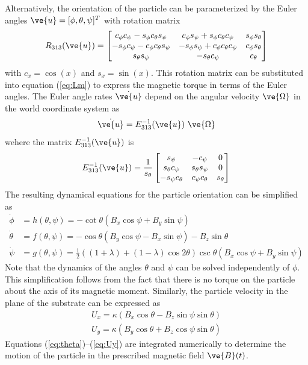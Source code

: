 Alternatively, the orientation of the particle can be parameterized by the Euler angles $\ve{u}=[\phi,\theta,\psi]^T$ with rotation matrix\autocite{Diebel2006}
\begin{equation}
    R_{313}(\ve{u}) = \begin{bmatrix} 
     c_\phi c_\psi -  s_\phi c_\theta s_\psi  &  c_\phi s_\psi + s_\phi c_\theta c_\psi  &  s_\phi s_\theta \\
   -s_\phi c_\psi  - c_\phi c_\theta s_\psi &  -s_\phi s_\psi + c_\phi  c_\theta c_\psi &  c_\phi s_\theta  \\
    s_\theta s_\psi  & - s_\theta c_\psi  & c_\theta  \end{bmatrix}
\end{equation}
with $c_x =\cos(x)$ and $s_x=\sin(x)$. This rotation matrix can be substituted into equation (\ref{eq:Lm}) to express the magnetic torque in terms of the Euler angles. The Euler angle rates $\dot{\ve{u}}$ depend on the angular velocity $\ve{\Omega}$ in the world coordinate system as 
\begin{equation}
    \dot{\ve{u}} = E_{313}^{-1}(\ve{u})~ \ve{\Omega}
\end{equation}
wehere the matrix $ E_{313}^{-1}(\ve{u})$ is \begin{equation}
    E^{-1}_{313}(\ve{u}) = \frac{1}{s_{\theta}}\begin{bmatrix} 
     s_{\psi} & -c_{\psi} & 0
     \\
     s_{\theta} c_{\psi} & s_{\theta} s_{\psi} & 0
     \\
     -s_{\psi}c_{\theta} & c_{\psi}c_{\theta} & s_{\theta}
     \end{bmatrix}
\end{equation}
The resulting dynamical equations for the particle orientation can be simplified as
\begin{align}
    \dot{\phi} &= h(\theta,\psi) = -\cot \theta (B_x\cos\psi +B_y\sin\psi)
    \\
    \dot{\theta} &= f(\theta,\psi) = -\cos\theta (B_y \cos\psi - B_x \sin\psi) - B_z\sin\theta \label{eq:theta}
    \\
    \dot{\psi} &= g(\theta,\psi) = \tfrac{1}{2} \left((1+\lambda) +(1-\lambda)\cos2\theta \right) \csc\theta (B_x \cos \psi + B_y\sin\psi ) \label{eq:psi}
\end{align}
Note that the dynamics of the angles $\theta$ and $\psi$ can be solved independently of $\phi$.  This simplification follows from the fact that there is no torque on the particle about the axis of its magnetic moment. Similarly, the particle velocity in the plane of the substrate can be expressed as
\begin{align}
    U_x = \kappa (B_x \cos \theta -  B_z \sin \psi \sin\theta) \label{eq:Ux}
    \\
    U_y = \kappa (B_y \cos\theta + B_z \cos\psi \sin\theta ) \label{eq:Uy}
\end{align}
Equations (\ref{eq:theta})--(\ref{eq:Uy}) are integrated numerically to determine the motion of the particle in the prescribed magnetic field $\ve{B}(t)$.
